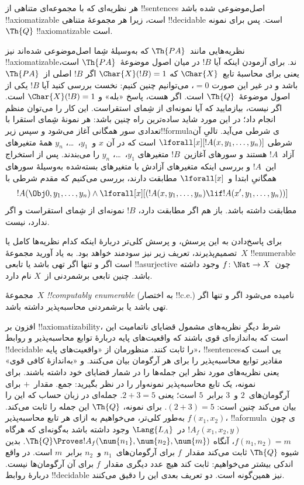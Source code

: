 \documentclass[../../../include/open-logic-section]{subfiles}
\begin{document}
\begin{ex}
هر نظریه‌ای که با مجموعه‌ای متناهی از !!{sentence}s اصل‌موضوعی شده باشد
!!{axiomatizable} است، زیرا هر مجموعهٔ متناهی !!{decidable} است.
پس برای نمونه~$\Th{Q}$ !!{axiomatizable} است.

نظریه‌هایی مانند~$\Th{PA}$ که به‌وسیلهٔ شِما اصل‌موضوعی شده‌اند نیز
!!{axiomatizable}ند. برای آزمودن اینکه آیا $!B$ در میان اصول
موضوعهٔ~$\Th{PA}$ است، یعنی برای محاسبهٔ تابع~$\Char{X}$ که
$\Char{X}(!B)=1$ اگر $!B$ اصلی از~$\Th{PA}$ باشد و در غیر این صورت
$=0$، می‌توانیم چنین کنیم: نخست بررسی کنید آیا $!B$ یکی از اصول
موضوعهٔ~$\Th{Q}$ است. اگر هست، پاسخ «بله» و
$\Char{X}(!B)=1$ است. اگر نیست، بیازمایید که آیا نمونه‌ای از شِمای
استقراست. این کار را می‌توان منظم انجام داد؛ در این مورد شاید
ساده‌ترین راه چنین باشد: هر نمونهٔ شِمای استقرا با تعدادی سور همگانی
آغاز می‌شود و سپس زیر!!{formula}ی شرطی می‌آید. تالیِ آن شرطی
$\lforall[x][!A(x,y_1,\dots,y_n)]$ است که در آن $x$ و~$y_1$،~\dots،
$y_n$ همهٔ متغیرهای آزاد~$!A$ هستند و سورهای آغازین~$!B$ متغیرهای
$y_1$،~\dots، $y_n$ را می‌بندند. پس از استخراج این~$!A$ و بررسی
اینکه متغیرهای آزادش با متغیرهای بسته‌شده به‌وسیلهٔ سورهای همگانیِ
ابتدا و~$\lforall[x]$ مطابقت دارند، بررسی می‌کنیم که مقدم شرطی با
\[
!A(\Obj 0, y_1, \dots, y_n) \land \lforall[x][(!A(x, y_1, \dots, y_n)
\lif !A(x', y_1, \dots, y_n))]
\]
مطابقت داشته باشد. باز هم اگر مطابقت دارد، $!B$ نمونه‌ای از شِمای
استقراست و اگر ندارد، نیست.
\end{ex}

برای پاسخ‌دادن به این پرسش، و پرسش کلی‌تر دربارهٔ اینکه کدام نظریه‌ها
کامل یا تصمیم‌پذیرند، تعریف زیر نیز سودمند خواهد بود. به یاد آورید
مجموعهٔ~$X$ !!{enumerable} است اگر و تنها اگر تهی باشد یا تابعی
!!a{surjective} چون~$f\colon\Nat\to X$ وجود داشته باشد. چنین تابعی برشمردنی
از~$X$ نام دارد.

\begin{defn}
مجموعهٔ~$X$ \emph{!!{computably enumerable}} (به اختصار !!{c.e.})
نامیده می‌شود اگر و تنها اگر تهی باشد یا برشمردنی محاسبه‌پذیر داشته
باشد.
\end{defn}

افزون بر !!{axiomatizability}، شرط دیگرِ نظریه‌های مشمول قضایای
ناتمامیت این است که به‌اندازه‌ای قوی باشند که واقعیت‌های پایه دربارهٔ
توابع محاسبه‌پذیر و روابط !!{decidable} را ثابت کنند. منظورمان از
«واقعیت‌های پایه»، !!{sentence}sیی است که مقادیر توابع محاسبه‌پذیر را
برای هر آرگومان بیان می‌کنند. و «به‌اندازهٔ کافی قوی» یعنی نظریه‌های
مورد نظر این جمله‌ها را در شمار قضایای خود داشته باشند. برای نمونه،
یک تابع محاسبه‌پذیر نمونه‌وار را در نظر بگیرید: جمع. مقدار~$+$ برای
آرگومان‌های~$2$ و~$3$ برابر~$5$ است؛ یعنی $2+3=5$. جمله‌ای در زبان
حساب که این را بیان می‌کند چنین است:
$(\num{2}+\num{3})=\num{5}$. برای نمونه، $\Th{Q}$ این جمله را ثابت
می‌کند. به‌طور کلی‌تر، می‌خواهیم به ازای هر تابع محاسبه‌پذیر
$f(x_1,x_2)$، !!a{formula}ی چون~$!A_f(x_1,x_2,y)$ در~$\Lang{L_A}$ وجود
داشته باشد به‌گونه‌ای که هرگاه $f(n_1,n_2)=m$، آنگاه
$\Th{Q}\Proves !A_f(\num{n_1},\num{n_2},\num{m})$. بدین شیوه
$\Th{Q}$ ثابت می‌کند مقدار~$f$ برای آرگومان‌های~$n_1$ و~$n_2$
برابر~$m$ است. در واقع اندکی بیشتر می‌خواهیم: ثابت کند هیچ عدد دیگری
مقدار~$f$ برای آن آرگومان‌ها نیست. دربارهٔ روابط !!{decidable} نیز
همین‌گونه است. دو تعریف بعدی این را دقیق می‌کنند.
\end{document}
